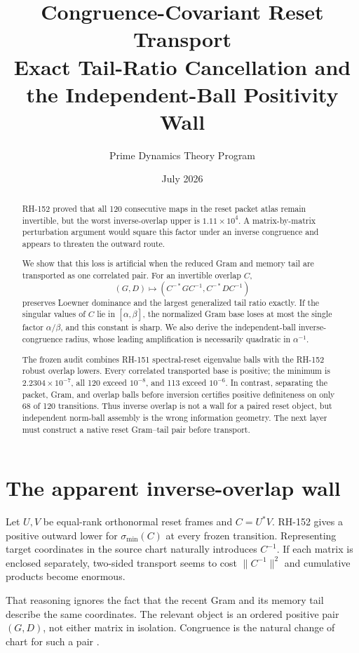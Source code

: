 \documentclass[12pt]{article}
\title{Congruence-Covariant Reset Transport\\\large Exact Tail-Ratio Cancellation and the Independent-Ball Positivity Wall}
\author{Prime Dynamics Theory Program}
\date{July 2026}
\begin{document}
\maketitle

\begin{abstract}
RH-152 proved that all 120 consecutive maps in the reset packet atlas remain
invertible, but the worst inverse-overlap upper is $1.11\times10^4$.  A
matrix-by-matrix perturbation argument would square this factor under an
inverse congruence and appears to threaten the outward route.

We show that this loss is artificial when the reduced Gram and memory tail
are transported as one correlated pair.  For an invertible overlap $C$,
\[
 (G,D)\longmapsto(C^{-*}GC^{-1},C^{-*}DC^{-1})
\]
preserves Loewner dominance and the largest generalized tail ratio exactly.
If the singular values of $C$ lie in $[\alpha,\beta]$, the normalized Gram
base loses at most the single factor $\alpha/\beta$, and this constant is
sharp.  We also derive the independent-ball inverse-congruence radius, whose
leading amplification is necessarily quadratic in $\alpha^{-1}$.

The frozen audit combines RH-151 spectral-reset eigenvalue balls with the
RH-152 robust overlap lowers.  Every correlated transported base is positive;
the minimum is $2.2304\times10^{-7}$, all 120 exceed $10^{-8}$, and 113
exceed $10^{-6}$.  In contrast, separating the packet, Gram, and overlap
balls before inversion certifies positive definiteness on only 68 of 120
transitions.  Thus inverse overlap is not a wall for a paired reset object,
but independent norm-ball assembly is the wrong information geometry.  The
next layer must construct a native reset Gram--tail pair before transport.
\end{abstract}

\section{The apparent inverse-overlap wall}
Let $U,V$ be equal-rank orthonormal reset frames and $C=U^*V$.  RH-152 gives
a positive outward lower for $\sigma_{\min}(C)$ at every frozen transition.
Representing target coordinates in the source chart naturally introduces
$C^{-1}$.  If each matrix is enclosed separately, two-sided transport seems
to cost $\|C^{-1}\|^2$ and cumulative products become enormous.

That reasoning ignores the fact that the recent Gram and its memory tail
describe the same coordinates.  The relevant object is an ordered positive
pair $(G,D)$, not either matrix in isolation.  Congruence is the natural
change of chart for such a pair \citep{HornJohnson2013}.
\end{document}
